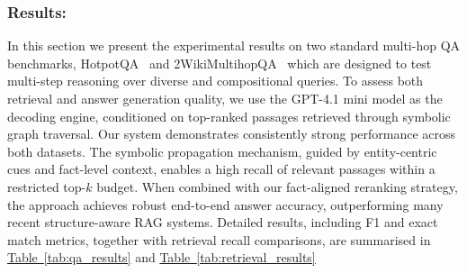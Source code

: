 \documentclass[runningheads]{llncs}
\begin{document}
\subsubsection{Results:}
In this section we present the experimental results on two standard multi-hop QA benchmarks, HotpotQA~\cite{yang2018hotpotqa} and 2WikiMultihopQA~\cite{ho2020constructing} which are designed to test multi-step reasoning over diverse and compositional queries. To assess both retrieval and answer generation quality, we use the GPT-4.1 mini model as the decoding engine, conditioned on top-ranked passages retrieved through symbolic graph traversal. Our system demonstrates consistently strong performance across both datasets. The symbolic propagation mechanism, guided by entity-centric cues and fact-level context, enables a high recall of relevant passages within a restricted top-$k$ budget. When combined with our fact-aligned reranking strategy, the approach achieves robust end-to-end answer accuracy, outperforming many recent structure-aware RAG systems. Detailed results, including F1 and exact match metrics, together with retrieval recall comparisons, are summarised in 
{\hypersetup{linkcolor=softblue}\hyperref[tab:qa_results]{Table~\ref*{tab:qa_results}}}
and
{\hypersetup{linkcolor=softblue}\hyperref[tab:retrieval_results]{Table~\ref*{tab:retrieval_results}}}


\end{document}
